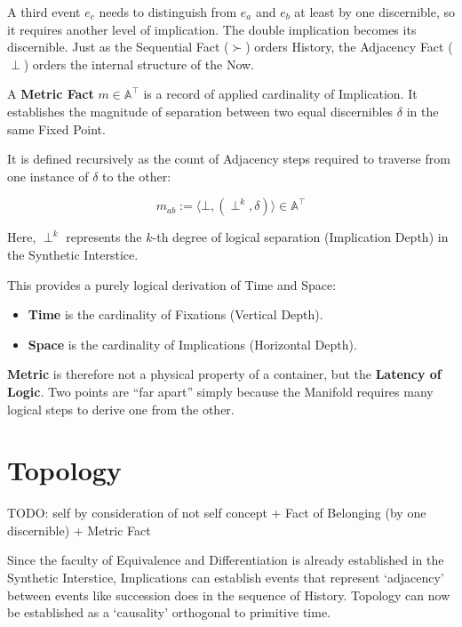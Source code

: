 A third event $e_c$ needs to distinguish from $e_a$ and $e_b$ at least by one
discernible, so it requires another level of implication. The double
implication becomes its discernible. Just as the Sequential Fact ($\succ$)
orders History, the Adjacency Fact ($\perp$) orders the internal structure of
the Now.

\begin{formalism}

    A \textbf{Metric Fact} $m \in \mathbb{A}^\top$ is a record of applied
    cardinality of Implication. It establishes the magnitude of separation
    between two equal discernibles $\delta$ in the same Fixed Point.
    
    It is defined recursively as the count of Adjacency steps required to
    traverse from one instance of $\delta$ to the other:

    \begin{equation}
        m_{ab} := \langle \bot, (\perp^k, \delta) \rangle \in \mathbb{A}^\top
    \end{equation}
    
    Here, $\perp^k$ represents the $k$-th degree of logical separation
    (Implication Depth) in the Synthetic Interstice.

\end{formalism}

This provides a purely logical derivation of Time and Space:

\begin{itemize}
    \item \textbf{Time} is the cardinality of Fixations (Vertical Depth).
    \item \textbf{Space} is the cardinality of Implications (Horizontal Depth).

\end{itemize}

\textbf{Metric} is therefore not a physical property of a container, but the
\textbf{Latency of Logic}. Two points are ``far apart'' simply because the
Manifold requires many logical steps to derive one from the other.

\section{Topology}

TODO: self by consideration of not self concept + Fact of Belonging (by one discernible) + Metric Fact

Since the faculty of Equivalence and Differentiation is already established in
the Synthetic Interstice, Implications can establish events that represent
`adjacency' between events like succession does in the sequence of History.
Topology can now be established as a `causality' orthogonal to primitive time.

